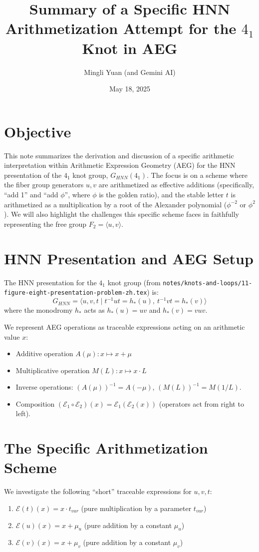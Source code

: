 \documentclass[12pt, a4paper]{article}
\title{Summary of a Specific HNN Arithmetization Attempt for the $4_1$ Knot in AEG}
\author{Mingli Yuan (and Gemini AI)}
\date{May 18, 2025}
\begin{document}
\maketitle

\section{Objective}
This note summarizes the derivation and discussion of a specific arithmetic interpretation within Arithmetic Expression Geometry (AEG) for the HNN presentation of the $4_1$ knot group, $G_{HNN}(4_1)$. The focus is on a scheme where the fiber group generators $u,v$ are arithmetized as effective additions (specifically, ``add 1'' and ``add $\phi$'', where $\phi$ is the golden ratio), and the stable letter $t$ is arithmetized as a multiplication by a root of the Alexander polynomial ($\phi^{-2}$ or $\phi^2$). We will also highlight the challenges this specific scheme faces in faithfully representing the free group $F_2 = \langle u,v \rangle$.

\section{HNN Presentation and AEG Setup}
The HNN presentation for the $4_1$ knot group (from \texttt{notes/knots-and-loops/11-figure-eight-presentation-problem-zh.tex}) is:
$$ G_{HNN} = \langle u, v, t \mid t^{-1}ut = h_*(u), \ t^{-1}vt = h_*(v) \rangle $$
where the monodromy $h_*$ acts as $h_*(u) = uv$ and $h_*(v) = vuv$.

We represent AEG operations as traceable expressions acting on an arithmetic value $x$:
\begin{itemize}
    \item Additive operation $A(\mu): x \mapsto x + \mu$
    \item Multiplicative operation $M(L): x \mapsto x \cdot L$
    \item Inverse operations: $(A(\mu))^{-1} = A(-\mu)$, $(M(L))^{-1} = M(1/L)$.
    \item Composition $(\mathcal{E}_1 \circ \mathcal{E}_2)(x) = \mathcal{E}_1(\mathcal{E}_2(x))$ (operators act from right to left).
\end{itemize}

\section{The Specific Arithmetization Scheme}
We investigate the following ``short'' traceable expressions for $u, v, t$:
\begin{enumerate}
    \item $\mathcal{E}(t)(x) = x \cdot t_{var}$ (pure multiplication by a parameter $t_{var}$)
    \item $\mathcal{E}(u)(x) = x + \mu_u$ (pure addition by a constant $\mu_u$)
    \item $\mathcal{E}(v)(x) = x + \mu_v$ (pure addition by a constant $\mu_v$)
\end{enumerate}
\end{document}
